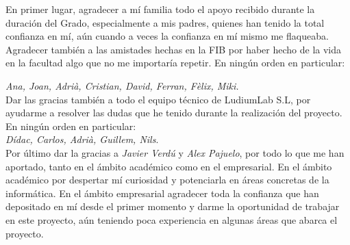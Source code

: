 
En primer lugar, agradecer a mí familia todo el apoyo recibido durante la duración del Grado, especialmente a mis padres, quienes han tenido la total confianza en mí, aún cuando a veces la confianza en mí mismo me flaqueaba. \\

Agradecer también a las amistades hechas en la FIB por haber hecho de la vida en la facultad algo que no me importaría repetir. En ningún orden en particular:

\textit{Ana, Joan, Adrià, Cristian, David, Ferran, Fèlix, Miki.}\\

Dar las gracias también a todo el equipo técnico de LudiumLab S.L, por ayudarme a resolver las dudas que he tenido durante la realización del proyecto. En ningún orden en particular: \\
\textit{Dídac, Carlos, Adrià, Guillem, Nils}. \\

Por último dar la gracias a \textit{Javier Verdú} y \textit{Alex Pajuelo}, por todo lo que me han aportado, tanto en el ámbito académico como en el empresarial. En el ámbito académico por despertar mí curiosidad y potenciarla en áreas concretas de la informática. En el ámbito empresarial agradecer toda la confianza que han depositado en mí desde el primer momento y darme la oportunidad de trabajar en este proyecto, aún teniendo poca experiencia en algunas áreas que abarca el proyecto.


  


